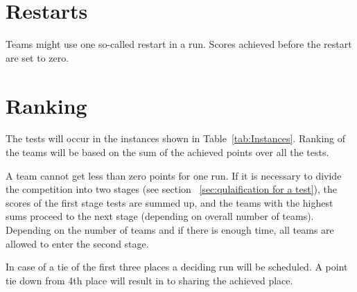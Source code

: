 \section{Restarts}
Teams might use one so-called restart in a run. Scores achieved before the restart are set to zero. 

\section{Ranking}
The tests will occur in the instances shown in Table~\ref{tab:Instances}. Ranking of the teams will be based on the sum of the achieved points over all the tests.

A team cannot get less than zero points for one run. If it is necessary to divide the competition into two stages (see section ~\ref{sec:qulaification for a test}), the scores of the first stage tests are summed up, and the teams with the highest sums proceed to the next stage (depending on overall number of teams). Depending on the number of teams and if there is enough time, all teams are allowed to enter the second stage.

In case of a tie of the first three places a deciding run will be scheduled. A point tie down from 4th place will result in to sharing the achieved place. 


%
%
%


